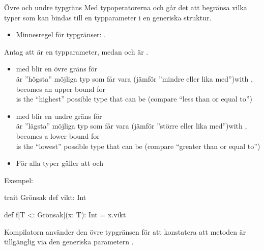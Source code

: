 \begin{Slide}{Övre och undre typgräns}\SlideFontSmall
Med typoperatorerna \code{<:} och \code{>:} går det att begränsa vilka typer som kan bindas till en typparameter i en generiska struktur.
\begin{itemize}
  \item Minnesregel för typgränser: . 
\end{itemize}
\vspace{0.5em}Antag att  är en  typparameter, medan  och  är . 
\begin{itemize}
  \item \ifswedish med  blir  en övre gräns  för \\ är ''högsta'' möjliga typ som  får vara (jämför ''mindre eller lika med'')\else with ,  becomes an upper bound for \\ is the ``highest'' possible type that  can be (compare ``less than or equal to'')\fi
  \item \ifswedish med  blir  en undre gräns  för \\ är ''lägsta'' möjliga typ som  får vara  (jämför ''större eller lika med'')\else with ,  becomes a lower bound for \\ is the ``lowest'' possible type that  can be (compare ``greater than or equal to'')\fi
  \item För alla typer  gäller att  och 
\end{itemize} 
\pause

\vspace{0.5em}Exempel: 
\begin{Code}
  trait Grönsak { def vikt: Int }

  def f[T <: Grönsak](x: T): Int = x.vikt
\end{Code}

Kompilatorn använder den övre typgränsen för att konstatera att metoden  är tillgänglig via den generiska parametern .

\end{Slide}

